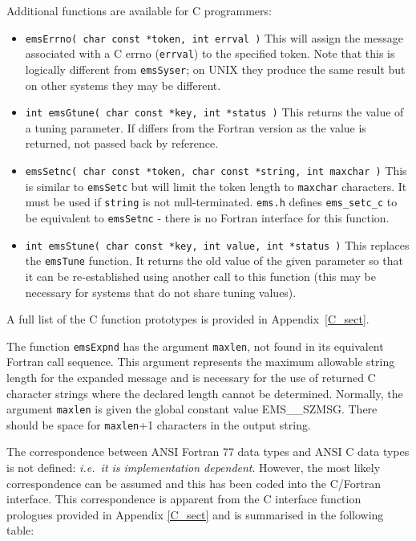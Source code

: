 \documentclass[twoside,11pt]{starlink}
\begin{document}
Additional functions are available for C programmers:
\begin{itemize}

\item \texttt{emsErrno( char const *token, int errval )}
This will assign the message associated
with a C errno (\texttt{errval}) to the specified token. Note that this is
logically different from \texttt{emsSyser}; on UNIX they produce the same
result but on other systems they may be different.

\item \texttt{int emsGtune( char const *key, int *status )}
This returns the value of a tuning parameter. If differs from the Fortran
version as the value is returned, not passed back by reference.

\item \texttt{emsSetnc( char const *token, char const *string, int maxchar )}
This is similar to \texttt{emsSetc} but will limit the token length to
\texttt{maxchar} characters.
It must be used if \texttt{string} is not null-terminated.
\texttt{ems.h} defines \texttt{ems\_setc\_c} to be equivalent to
\texttt{emsSetnc} - there is no Fortran interface for this function.

\item \texttt{int emsStune( char const *key, int value, int *status )}
This replaces the \texttt{emsTune} function. It returns the old value of
the given parameter so that it can be re-established using another call
to this function (this may be necessary for systems that do not share
tuning values).


\end{itemize}
A full list of the C function prototypes is provided in Appendix~\ref{C_sect}.

The function \texttt{emsExpnd} has the argument \texttt{maxlen}, not found in
its equivalent Fortran call sequence.
This argument represents the maximum allowable string length for the expanded
message and is necessary for the use of returned C character strings where the
declared length cannot be determined.
Normally, the argument \texttt{maxlen} is given the global constant value
EMS\_\_SZMSG. There should be space for \texttt{maxlen}+1 characters in the
output string.

The correspondence between ANSI Fortran 77 data types and ANSI C data types
is not defined: \textit{i.e.\ it is implementation dependent}.
However, the most likely correspondence can be assumed and this has been coded
into the C/Fortran interface.
This correspondence is apparent from the C interface function prologues
provided in Appendix \ref{C_sect} and is summarised in the following table:
\end{document}
